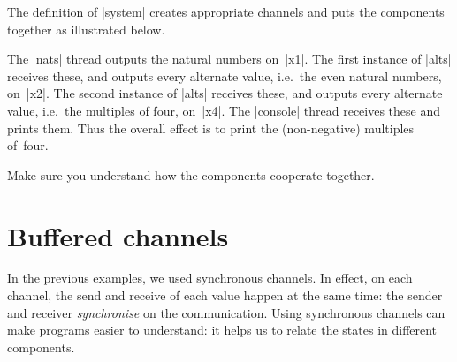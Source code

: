 The definition of |system| creates appropriate channels and puts the
components together as illustrated below.
%
\begin{center}
\end{center}
%
The |nats| thread outputs the natural numbers on~|x1|.  The first instance of
|alts| receives these, and outputs every alternate value, i.e.~the even
natural numbers, on~|x2|.  The second instance of |alts| receives these, and
outputs every alternate value, i.e.~the multiples of four, on~|x4|.  The
|console| thread receives these and prints them.  Thus the overall effect is
to print the (non-negative) multiples of~four.

\begin{instruction}
Make sure you understand how the components cooperate together.
\end{instruction}


\section{Buffered channels}

In the previous examples, we used synchronous channels.  In effect, on each
channel, the send and receive of each value happen at the same time: the
sender and receiver \emph{synchronise} on the communication.
%
Using synchronous channels can make programs easier to understand: it helps us
to relate the states in different components.

